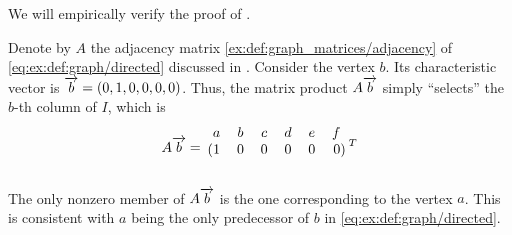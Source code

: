 \begin{example}\label{ex:thm:graphs_as_linear_transformations}
  We will empirically verify the proof of .

  Denote by \( A \) the adjacency matrix \eqref{ex:def:graph_matrices/adjacency} of \eqref{eq:ex:def:graph/directed} discussed in . Consider the vertex \( b \). Its characteristic vector is \( \overrightarrow{b} = (0, 1, 0, 0, 0, 0) \). Thus, the matrix product \( A \overrightarrow{b} \) simply \enquote{selects} the \( b \)-th column of \( I \), which is
  \begin{equation*}
    A \vect{b}
    =
    \begin{blockarray}{cccccrl}
      a        & b        & c        & d        & e        & f \\
    \begin{block}{(cccccr)l}
      1        & 0        & 0        & 0        & 0        & 0 \\
    \end{block}
    \end{blockarray}
    {}^T
  \end{equation*}

  The only nonzero member of \( A \overrightarrow{b} \) is the one corresponding to the vertex \( a \). This is consistent with \( a \) being the only predecessor of \( b \) in \eqref{eq:ex:def:graph/directed}.
\end{example}

